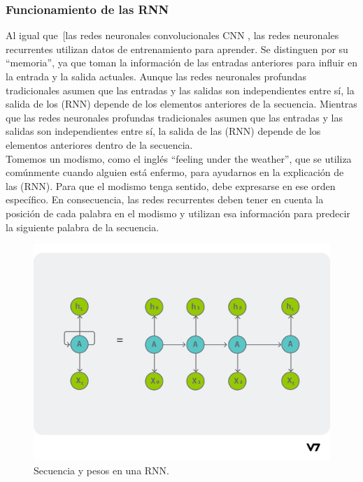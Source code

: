 \documentclass{article}
\begin{document}
\subsubsection{Funcionamiento de las RNN}
Al igual que [las redes neuronales convolucionales CNN \cite{ibm-cnn}, las redes neuronales recurrentes utilizan datos de entrenamiento para aprender.
Se distinguen por su ``memoria'', ya que toman la información de las entradas anteriores para influir en la entrada y la salida actuales.
Aunque las redes neuronales profundas tradicionales asumen que las entradas y las salidas son independientes entre sí, la salida de los (RNN) depende de los elementos anteriores de la secuencia.
Mientras que las redes neuronales profundas tradicionales asumen que las entradas y las salidas son independientes entre sí, la salida de las (RNN) depende de los elementos anteriores dentro de la secuencia. \\

Tomemos un modismo, como el inglés ``feeling under the weather'', que se utiliza comúnmente cuando alguien está enfermo, para ayudarnos en la explicación de las (RNN).
Para que el modismo tenga sentido, debe expresarse en ese orden específico.
En consecuencia, las redes recurrentes deben tener en cuenta la posición de cada palabra en el modismo y utilizan esa información para predecir la siguiente palabra de la secuencia.

\begin{figure}[H]
    \centering
    \includegraphics[scale=0.2]{secuencia.png}
    \caption{Secuencia y pesos en una RNN.}
\end{figure}
\end{document}

